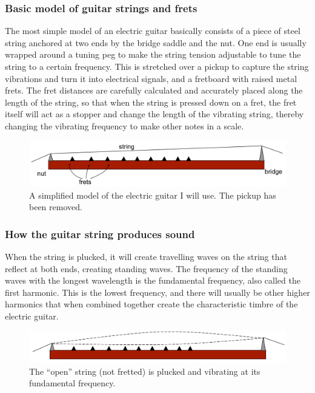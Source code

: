 \documentclass[11pt]{article}
\begin{document}
\begin{flushleft}
            \subsubsection*{Basic model of guitar strings and frets}
                The most simple model of an electric guitar basically consists of a piece of steel string anchored at two ends by the bridge saddle and the nut. One end is usually wrapped around a tuning peg to make the string tension adjustable to tune the string to a certain frequency. This is stretched over a pickup to capture the string vibrations and turn it into electrical signals, and a fretboard with raised metal frets. The fret distances are carefully calculated and accurately placed along the length of the string, so that when the string is pressed down on a fret, the fret itself will act as a stopper and change the length of the vibrating string, thereby changing the vibrating frequency to make other notes in a scale. 
                \begin{figure}[h]
                    \includegraphics[width=\textwidth]{fig1.png}
                    \caption{A simplified model of the electric guitar I will use. The pickup has been removed.}\label{fig1}
                \end{figure} 
                
                \FloatBarrier
            \subsubsection*{How the guitar string produces sound}
                When the string is plucked, it will create travelling waves on the string that reflect at both ends, creating standing waves. The frequency of the standing waves with the longest wavelength is the fundamental frequency, also called the first harmonic. This is the lowest frequency, and there will usually be other higher harmonics that when combined together create the characteristic timbre of the electric guitar. 
                \begin{figure}[h]
                    \includegraphics[width=\textwidth]{fig2.png}
                    \caption{The “open” string (not fretted) is plucked and vibrating at its fundamental frequency.}\label{fig2}
                \end{figure} 
            

\end{flushleft}
\end{document}
